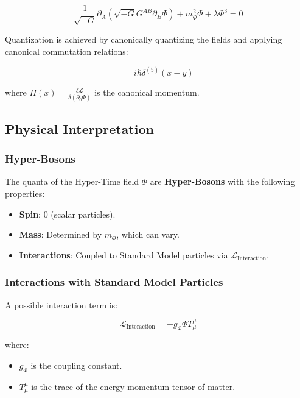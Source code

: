 \documentclass[11pt,a4paper]{article}
\begin{document}
\begin{equation}
\frac{1}{\sqrt{-G}} \partial_A \left( \sqrt{-G} G^{AB} \partial_B \Phi \right) + m_\Phi^2 \Phi + \lambda \Phi^3 = 0
\end{equation}

Quantization is achieved by canonically quantizing the fields and applying canonical commutation relations:

\begin{equation}
[\Phi(x), \Pi(y)] = i \hbar \delta^{(5)}(x - y)
\end{equation}

where $\Pi(x) = \frac{\delta \mathcal{L}}{\delta (\partial_0 \Phi)}$ is the canonical momentum.

\subsection{Physical Interpretation}

\subsubsection{Hyper-Bosons}

The quanta of the Hyper-Time field $\Phi$ are \textbf{Hyper-Bosons} with the following properties:

\begin{itemize}
    \item \textbf{Spin}: 0 (scalar particles).
    \item \textbf{Mass}: Determined by $m_\Phi$, which can vary.
    \item \textbf{Interactions}: Coupled to Standard Model particles via $\mathcal{L}_{\text{Interaction}}$.
\end{itemize}

\subsubsection{Interactions with Standard Model Particles}

A possible interaction term is:

\begin{equation}
\mathcal{L}_{\text{Interaction}} = - g_\Phi \Phi T^\mu_\mu
\end{equation}

where:

\begin{itemize}
    \item $g_\Phi$ is the coupling constant.
    \item $T^\mu_\mu$ is the trace of the energy-momentum tensor of matter.
\end{itemize}
\end{document}
